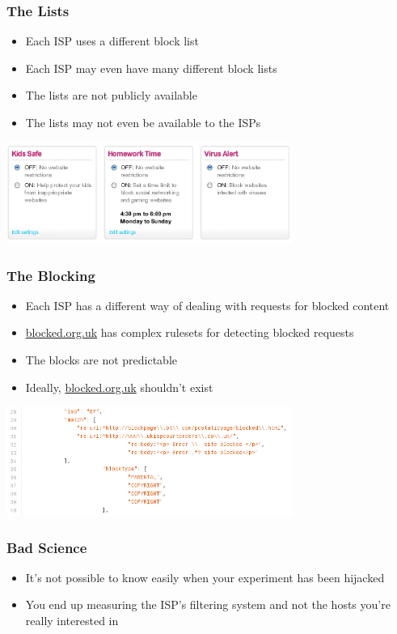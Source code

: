 \documentclass{beamer}
\begin{document}
\begin{frame}
	\frametitle{The Lists}
	\begin{itemize}
		\item{Each ISP uses a different block list}
		\item{Each ISP may even have many different block lists}
		\item{The lists are not publicly available}
		\item{The lists may not even be available to the ISPs}
	\end{itemize}
	\begin{center}
		\includegraphics[width=0.7\textwidth]{talktalk.png}
	\end{center}
\end{frame}

\begin{frame}
	\frametitle{The Blocking}
	\begin{itemize}
		\item{Each ISP has a different way of dealing with requests for blocked content}
		\item{\url{blocked.org.uk} has complex rulesets for detecting blocked requests}
		\item{The blocks are not predictable}
		\item{Ideally, \url{blocked.org.uk} shouldn't exist}
	\end{itemize}
	\begin{center}
		\includegraphics[width=0.7\textwidth]{blockedrules.png}
	\end{center}
\end{frame}

\begin{frame}
	\frametitle{Bad Science}
	\begin{itemize}
		\item{It's not possible to know easily when your experiment has
			been hijacked}
		\item{You end up measuring the ISP's filtering system and not
			the hosts you're really interested in}
	\end{itemize}
\end{frame}
\end{document}
